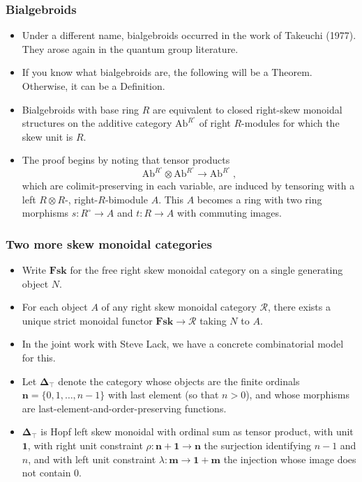 \documentclass{beamer}
\newcommand{\lra}{\longrightarrow}
\def\CR{{\mathscr R}}
\begin{document}
\begin{frame}
  \frametitle{Bialgebroids}
\begin{itemize}
\item Under a different name, bialgebroids occurred in the work of Takeuchi (1977). 
They arose again in the quantum group literature. 
\item If you know what bialgebroids are, the following will be a Theorem. Otherwise, it can be a Definition.
  \pause
 \item
 \begin{theorem}
Bialgebroids with base ring $R$ are equivalent to closed right-skew monoidal structures
on the additive category $\mathrm{Ab}^{R^{\circ}}$ of right $R$-modules for which the skew unit is $R$. 
 \end{theorem}
 \pause
 \item The proof begins by noting that tensor products 
 $$\mathrm{Ab}^{R^{\circ}} \otimes \mathrm{Ab}^{R^{\circ}} \lra \mathrm{Ab}^{R^{\circ}} \ ,$$
 which are colimit-preserving in each variable, are induced by tensoring with a left 
 $R\otimes R$-, right-$R$-bimodule $A$. This $A$ becomes a ring with two
 ring morphisms $s : R^{\circ} \lra A$ and $t : R \lra A$ with commuting images. 
\end{itemize}

\end{frame}
 \begin{frame}
  \frametitle{Two more skew monoidal categories}
  \begin{itemize}
\item Write $\mathbf{Fsk}$ for the free right skew monoidal category on a single generating object $N$.
\pause 
\item For each object $A$ of any right skew monoidal category $\CR$, there exists a unique
strict monoidal functor $\mathbf{Fsk} \lra \CR$ taking $N$ to $A$. 
\pause
\item In the joint work with Steve Lack, we have a concrete combinatorial model for this.
\pause
\item Let $\mathbf{\Delta}_{\top}$ denote the category whose objects are the finite ordinals 
$\mathbf{n} = \{0,1,\dots , n-1\}$
with last element (so that $n>0$), 
and whose morphisms are last-element-and-order-preserving functions.
\pause
\item $\mathbf{\Delta}_{\top}$ is Hopf left skew monoidal with ordinal sum as
tensor product, with unit $\mathbf{1}$, with right unit constraint $\rho : \mathbf{n+1}\lra \mathbf{n}$
the surjection identifying $n-1$ and $n$, and with left unit constraint $\lambda : \mathbf{m}\lra \mathbf{1+m}$ the injection whose image does not contain $0$.   
\end{itemize}
\end{frame}
\end{document}
